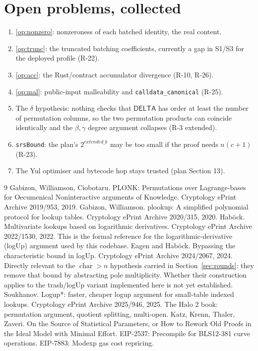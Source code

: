 \documentclass[11pt]{article}
\begin{document}
\section{Open problems, collected}\label{sec:open}
\begin{enumerate}
\item \ref{op:nonzero}: nonzeroness of each batched identity, the real content.
\item \ref{op:trunc}: the truncated batching coefficients, currently a gap in S1/S3
for the deployed profile (R-22).
\item \ref{op:acc}: the Rust/contract accumulator divergence (R-10, R-26).
\item \ref{op:mal}: public-input malleability and \texttt{calldata\_canonical}
(R-25).
\item The $\delta$ hypothesis: nothing checks that $\mathsf{DELTA}$ has order at
least the number of permutation columns, so the two permutation products can
coincide identically and the $\beta,\gamma$ degree argument collapses (R-3
extended).
\item \texttt{srsBound}: the plan's $2^{\mathit{extended\_k}}$ may be too small if
the proof needs $n(c+1)$ (R-23).
\item The Yul optimiser and bytecode hop stays trusted (plan Section 13).
\end{enumerate}

\begin{thebibliography}{9}
 Gabizon, Williamson, Ciobotaru. PLONK: Permutations over
Lagrange-bases for Oecumenical Noninteractive arguments of Knowledge.
Cryptology ePrint Archive 2019/953, 2019.
 Gabizon, Williamson. plookup: A simplified polynomial protocol
for lookup tables. Cryptology ePrint Archive 2020/315, 2020.
 Hab\"ock. Multivariate lookups based on logarithmic derivatives.
Cryptology ePrint Archive 2022/1530, 2022. This is the formal reference for the
logarithmic-derivative (logUp) argument used by this codebase.
 Eagen and Hab\"ock. Bypassing the characteristic bound in
logUp. Cryptology ePrint Archive 2024/2067, 2024. Directly relevant to the
$\operatorname{char} > n$ hypothesis carried in Section~\ref{sec:rounds}: they
remove that bound by abstracting pole multiplicity. Whether their construction
applies to the trash/logUp variant implemented here is not yet established.
 Soukhanov. Logup*: faster, cheaper logup argument for
small-table indexed lookups. Cryptology ePrint Archive 2025/946, 2025.
 The Halo 2 book: permutation argument, quotient splitting,
multi-open.
 Katz, Krenn, Thaler, Zaveri. On the Source of Statistical Parameters,
or How to Rework Old Proofs in the Ideal Model with Minimal Effort.
 EIP-2537: Precompile for BLS12-381 curve operations.
 EIP-7883: Modexp gas cost repricing.
\end{thebibliography}
\end{document}
